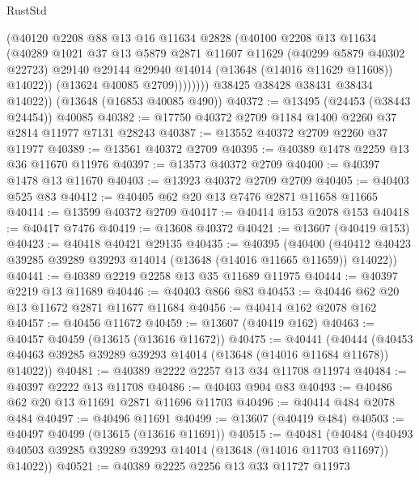 \begin{lexlean}{RustStd}
\begin{coremodule}
                    (@40120
                      @2208
                      @88
                      @13
                      @16
                      @11634
                      @2828
                      (@40100
                        @2208
                        @13
                        @11634
                        (@40289
                          @1021
                          @37
                          @13
                          @5879
                          @2871
                          @11607
                          @11629
                          (@40299 @5879 @40302 @22723)
                          @29140
                          @29144
                          @29940
                          @14014
                          (@13648 (@14016 @11629 @11608))
                          @14022))
                      (@13624 @40085 @2709))))))))
        @38425
        @38428
        @38431
        @38434
        @14022))
    (@13648 (@16853 @40085 @490))
@40372 := @13495 (@24453 (@38443 @24454)) @40085
@40382 := @17750 @40372 @2709 @1184 @1400 @2260 @37 @2814 @11977 @7131 @28243
@40387 := @13552 @40372 @2709 @2260 @37 @11977
@40389 := @13561 @40372 @2709
@40395 := @40389 @1478 @2259 @13 @36 @11670 @11976
@40397 := @13573 @40372 @2709
@40400 := @40397 @1478 @13 @11670
@40403 := @13923 @40372 @2709 @2709
@40405 := @40403 @525 @83
@40412 := @40405 @62 @20 @13 @7476 @2871 @11658 @11665
@40414 := @13599 @40372 @2709
@40417 := @40414 @153 @2078 @153
@40418 := @40417 @7476
@40419 := @13608 @40372
@40421 := @13607 (@40419 @153)
@40423 := @40418 @40421 @29135
@40435 := @40395
    (@40400 (@40412 @40423 @39285 @39289 @39293 @14014 (@13648 (@14016 @11665 @11659)) @14022))
@40441 := @40389 @2219 @2258 @13 @35 @11689 @11975
@40444 := @40397 @2219 @13 @11689
@40446 := @40403 @866 @83
@40453 := @40446 @62 @20 @13 @11672 @2871 @11677 @11684
@40456 := @40414 @162 @2078 @162
@40457 := @40456 @11672
@40459 := @13607 (@40419 @162)
@40463 := @40457 @40459 (@13615 (@13616 @11672))
@40475 := @40441
    (@40444 (@40453 @40463 @39285 @39289 @39293 @14014 (@13648 (@14016 @11684 @11678)) @14022))
@40481 := @40389 @2222 @2257 @13 @34 @11708 @11974
@40484 := @40397 @2222 @13 @11708
@40486 := @40403 @904 @83
@40493 := @40486 @62 @20 @13 @11691 @2871 @11696 @11703
@40496 := @40414 @484 @2078 @484
@40497 := @40496 @11691
@40499 := @13607 (@40419 @484)
@40503 := @40497 @40499 (@13615 (@13616 @11691))
@40515 := @40481
    (@40484 (@40493 @40503 @39285 @39289 @39293 @14014 (@13648 (@14016 @11703 @11697)) @14022))
@40521 := @40389 @2225 @2256 @13 @33 @11727 @11973

\end{coremodule}
\end{lexlean}
